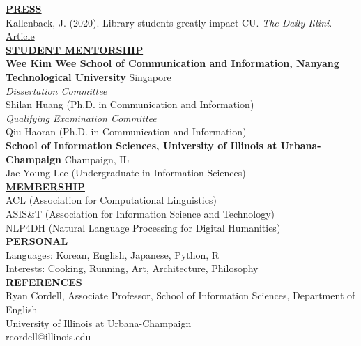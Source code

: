 \documentclass{article}
\begin{document}
\noindent \textbf{\underline{PRESS}} \\
\noindent Kallenback, J. (2020). Library students greatly impact CU. \textit{The Daily Illini}. \hfill \href{https://dailyillini.com/life_and_culture-stories/2020/11/11/library-students-greatly-impact-cu/}{Article} \\


\noindent \textbf{\underline{STUDENT MENTORSHIP}} \\
\noindent \textbf{Wee Kim Wee School of Communication and Information, Nanyang Technological University} \hfill Singapore \\
\noindent \textit{Dissertation Committee} \\
\noindent Shilan Huang (Ph.D. in Communication and Information) \\

\noindent \textit{Qualifying Examination Committee} \\
\noindent Qiu Haoran (Ph.D. in Communication and Information) \\

\noindent \textbf{School of Information Sciences, University of Illinois at Urbana-Champaign} \hfill Champaign, IL \\
\noindent Jae Young Lee (Undergraduate in Information Sciences) \\


\noindent \textbf{\underline{MEMBERSHIP}} \\ 
\noindent ACL (Association for Computational Linguistics) \\
\noindent ASIS\&T (Association for Information Science and Technology) \\
\noindent NLP4DH (Natural Language Processing for Digital Humanities) \\

\noindent \textbf{\underline{PERSONAL}} \\
\noindent Languages: Korean, English, Japanese, Python, R \\
\noindent Interests: Cooking, Running, Art, Architecture, Philosophy \\

\noindent \textbf{\underline{REFERENCES}} \\
\noindent Ryan Cordell, Associate Professor, School of Information Sciences, Department of English \\ 
University of Illinois at Urbana-Champaign \\
rcordell@illinois.edu \\
\end{document}
